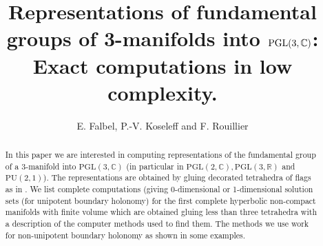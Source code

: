 \documentclass{amsart}
\title[]{Representations of fundamental groups of 3-manifolds into $\PGL(3,\bC)$: Exact computations in low complexity. }
\author{E. Falbel, P.-V. Koseleff and F. Rouillier}
\theoremstyle{definition}
\theoremstyle{remark}
\newcommand\bC{\mathbb{C}}
\newcommand\bR{\mathbb{R}}
\newcommand\PGL{\textrm{PGL}}
\newcommand\PU{\textrm{PU}}
\numberwithin{equation}{subsection}
\begin{document}
\begin{abstract}
In this paper we are interested in computing representations
of the fundamental group of a 3-manifold  into $\PGL(3,\bC)$ (in particular in $\PGL(2,\bC),
\PGL(3,\bR)$ and $\PU(2,1)$).  The representations are obtained
by gluing decorated tetrahedra of flags as in \cite{falbeleight, BFG}.  We list complete computations (giving 0-dimensional or 1-dimensional solution sets (for unipotent boundary holonomy)
for the first complete hyperbolic non-compact manifolds with finite volume which are obtained gluing less than three tetrahedra with a description of the computer methods used to find them.
The methods we use work for non-unipotent boundary holonomy as shown in some examples.
\end{abstract}

\maketitle
\begin{center}
\parbox{12cm}{\small
\tableofcontents
}
\end{center}



%
%



\end{document}
